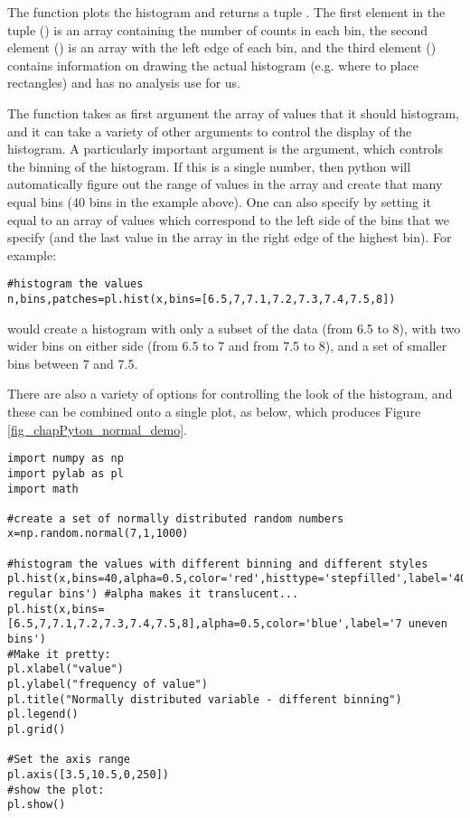 The  function plots the histogram and returns a tuple . The first element in the tuple () is an array containing the number of counts in each bin, the second element () is an array with the left edge of each bin, and the third element () contains information on drawing the actual histogram (e.g. where to place rectangles) and has no analysis use for us.

The  function takes as first argument the array of values that it should histogram, and it can take a variety of other arguments to control the display of the histogram. A particularly important argument is the  argument, which controls the binning of the histogram. If this is a single number, then python will automatically figure out the range of values in the array and create that many equal bins (40 bins in the example above). One can also specify  by setting it equal to an array of values which correspond to the left side of the bins that we specify (and the last value in the array in the right edge of the highest bin). For example:
\begin{lstlisting}[frame=single] 
#histogram the values
n,bins,patches=pl.hist(x,bins=[6.5,7,7.1,7.2,7.3,7.4,7.5,8])
\end{lstlisting}
would create a histogram with only a subset of the data (from 6.5 to 8), with two wider bins on either side (from 6.5 to 7 and from 7.5 to 8), and a set of smaller bins between 7 and 7.5.

There are also a variety of options for controlling the look of the histogram, and these can be combined onto a single plot, as below, which produces Figure \ref{fig_chapPyton_normal_demo}.
\begin{lstlisting}[frame=single] 
import numpy as np
import pylab as pl
import math 

#create a set of normally distributed random numbers
x=np.random.normal(7,1,1000)

#histogram the values with different binning and different styles
pl.hist(x,bins=40,alpha=0.5,color='red',histtype='stepfilled',label='40 regular bins') #alpha makes it translucent...
pl.hist(x,bins=[6.5,7,7.1,7.2,7.3,7.4,7.5,8],alpha=0.5,color='blue',label='7 uneven bins')
#Make it pretty:
pl.xlabel("value")
pl.ylabel("frequency of value")
pl.title("Normally distributed variable - different binning")
pl.legend()
pl.grid()

#Set the axis range
pl.axis([3.5,10.5,0,250])
#show the plot:
pl.show()
\end{lstlisting}

